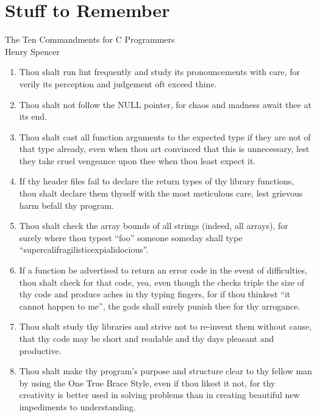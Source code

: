 \section{Stuff to Remember}
\begin{center}
{\Large The Ten Commandments for C Programmers}\\[.25in]
Henry Spencer\\
\end{center}
\begin{enumerate}
\item Thou shalt run lint frequently and study its pronouncements with care, for
verily its perception and judgement oft exceed thine. 

\item Thou shalt not follow the NULL pointer, for chaos and madness await thee
at its end. 

\item Thou shalt cast all function arguments to the expected type if they
are not of that type already, even when thou art convinced that this is
unnecessary, lest they take cruel vengeance upon thee when thou least expect
it. 

\item If thy header files fail to declare the return types of thy library
functions, thou shalt declare them thyself with the most meticulous care, lest
grievous harm befall thy program. 

\item Thou shalt check the array bounds of all strings (indeed, all arrays),
for surely where thou  typest ``foo'' someone someday shall type
``supercalifragilisticexpialidocious''. 

\item If a function be advertised to return an error code in the event of
difficulties, thou shalt check for that code, yea, even though the checks
triple the size of thy code and produce aches in thy typing fingers, for if
thou thinkest ``it cannot happen to me'', the gods shall surely punish thee
for thy arrogance. 

\item Thou shalt study thy libraries and strive not to re-invent them without
cause, that thy code may be short and readable and thy days pleasant and
productive.

\item Thou shalt make thy program's purpose and structure clear to thy
fellow man by using the One True Brace Style, even if thou likest it not,
for thy creativity is better used in solving problems than in creating
beautiful new impediments to understanding. 


\end{enumerate}
